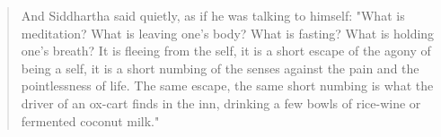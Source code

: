 \documentclass[a4paper, 12pt]{article}
\begin{document}
\begin{quote} And Siddhartha said quietly, as if he was talking to himself:
    "What is meditation? What is leaving one's body? What is fasting? What is
    holding one's breath? It is fleeing from the self, it is a short escape of
    the agony of being a self, it is a short numbing of the senses against the
    pain and the pointlessness of life. The same escape, the same short numbing
    is what the driver of an ox-cart finds in the inn, drinking a few bowls of
    rice-wine or fermented coconut milk." 
\end{quote}
\end{document}

